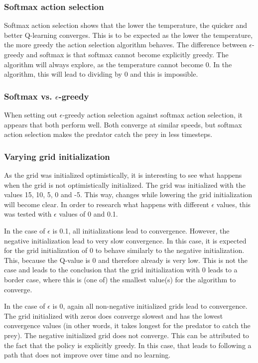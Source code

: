 \documentclass{article}
\begin{document}
\subsubsection{Softmax action selection}
Softmax action selection shows that the lower the temperature, the quicker and better Q-learning converges. This is to be expected as the lower the temperature, the more greedy the action selection algorithm behaves. The difference between $\epsilon$-greedy and softmax is that softmax cannot become explicitly greedy. The algorithm will always explore, as the temperature cannot become 0. In the algorithm, this will lead to dividing by 0 and this is impossible. 

\subsubsection{Softmax vs. $\epsilon$-greedy}
When setting out $\epsilon$-greedy action selection against softmax action selection, it appears that both perform well. Both converge at similar speeds, but softmax action selection makes the predator catch the prey in less timesteps.

\subsubsection{Varying grid initialization}
As the grid was initialized optimistically, it is interesting to see what happens when the grid is not optimistically initialized. The grid was initialized with the values 15, 10, 5, 0 and -5. This way, changes while lowering the grid initialization will become clear. In order to research what happens with different $\epsilon$ values, this was tested with $\epsilon$ values of 0 and 0.1. 

In the case of $\epsilon$ is 0.1, all initializations lead to convergence. However, the negative initialization lead to very slow convergence. In this case, it is expected for the grid initialization of 0 to behave similarly to the negative initialization. This, because the Q-value is 0 and therefore already is very low. This is not the case and leads to the conclusion that the grid initialization with 0 leads to a border case, where this is (one of) the smallest value(s) for the algorithm to converge.

In the case of $\epsilon$ is 0, again all non-negative initialized grids lead to convergence. The grid initialized with zeros does converge slowest and has the lowest convergence values (in other words, it takes longest for the predator to catch the prey). The negative initialized grid does not converge. This can be attributed to the fact that the policy is explicitly greedy. In this case, that leads to following a path that does not improve over time and no learning. 
\end{document}
